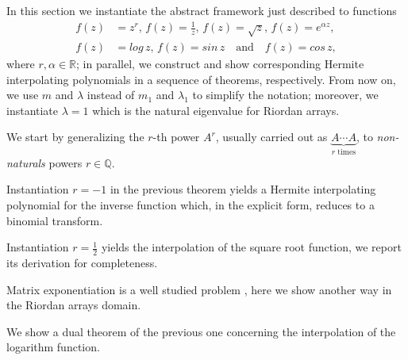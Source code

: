 In this section we instantiate the abstract framework just described to functions
\begin{displaymath}
\begin{split}
f(z)&=z^{r},\,{f(z)=\frac{1}{z}},\,{f(z)=\sqrt{z}},\,{f(z)=e^{\alpha z}},\\
f(z)&=log\,{z},\,f(z)=sin\,{z}\quad\text{and}\quad f(z)=cos\,{z},
\end{split}
\end{displaymath}
where $r,\alpha\in\mathbb{R}$; in parallel, we construct and show corresponding
Hermite interpolating polynomials in a sequence of theorems, respectively.
From now on, we use $m$ and $\lambda$ instead of $m_{1}$ and $\lambda_{1}$ to
simplify the notation; moreover, we instantiate $\lambda=1$ which is the
natural eigenvalue for Riordan arrays.

We start by generalizing the $r$-th power $A^{r}$, usually carried out
as $\underbrace{A\cdots A}_{r\text{ times}}$, to \textit{non-naturals} powers
$r\in\mathbb{Q}$.



Instantiation $r=-1$ in the previous theorem yields a Hermite interpolating
polynomial for the inverse function which, in the explicit form, reduces to
a binomial transform.



\vfill

Instantiation $r=\frac{1}{2}$ yields the interpolation of the square root function,
we report its derivation for completeness.



Matrix exponentiation is a well studied problem \citep{MOLERLOAN2003}, here
we show another way in the Riordan arrays domain.



We show a dual theorem of the previous one concerning the interpolation of the
logarithm function.

\vfill




